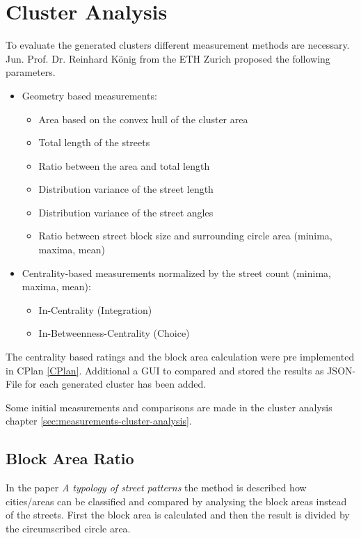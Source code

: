 \section{Cluster Analysis}
\label{sec:clusterRating}
To evaluate the generated clusters different measurement methods are necessary. Jun. Prof. Dr.  Reinhard König from the ETH Zurich proposed the following parameters.
\newline
\begin{itemize}
    \item Geometry based measurements:
    \begin{itemize}
        \item Area based on the convex hull of the cluster area
        \item Total length of the streets
        \item Ratio between the area and total length
        \item Distribution variance of the street length
        \item Distribution variance of the street angles
        \item Ratio between street block size and surrounding circle area (minima, maxima, mean)
    \end{itemize}
    \item Centrality-based measurements normalized by the street count (minima, maxima, mean):
    \begin{itemize}
        \item In-Centrality (Integration)
        \item In-Betweenness-Centrality (Choice)
    \end{itemize}
\end{itemize}
The centrality based ratings and the block area calculation were pre implemented in CPlan \ref{CPlan}. Additional a GUI to compared and stored the results as JSON-File for each generated cluster has been added.

Some initial measurements and comparisons are made in the cluster analysis chapter \ref{sec:measurements-cluster-analysis}.

\subsection{Block Area Ratio}
In the paper \textit{A typology of street patterns}\citep{blockArea:2014} the method is described how cities/areas can be classified and compared by analysing the block areas instead of the streets. First the block area is calculated and then the result is divided by the circumscribed circle area.


